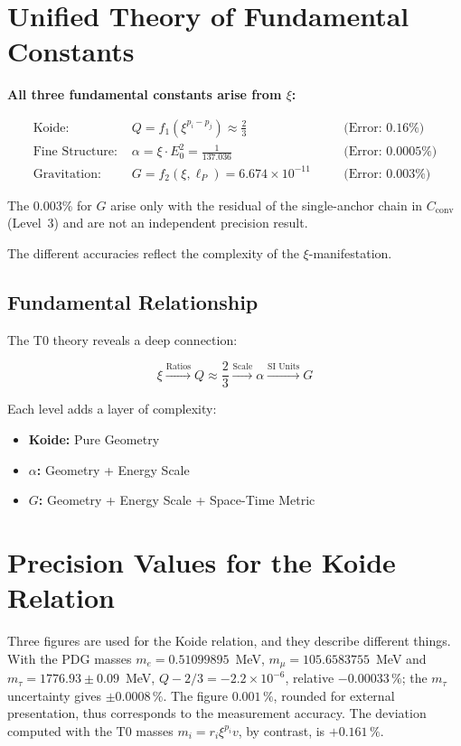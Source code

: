 
	\section{Unified Theory of Fundamental Constants}
	
	\begin{folgerung}
		\textbf{All three fundamental constants arise from $\xi$:}
		
		\begin{align}
			\text{Koide: } & Q = f_1(\xi^{p_i - p_j}) \approx \frac{2}{3} \quad &&\text{(Error: } 0.16\%) \\
			\text{Fine Structure: } & \alpha = \xi \cdot E_0^2 = \frac{1}{137.036} \quad &&\text{(Error: } 0.0005\%) \\
			\text{Gravitation: } & G = f_2(\xi, \ell_P) = 6.674 \times 10^{-11} \quad &&\text{(Error: } 0.003\%)
		\end{align}
		
		The $0.003\%$ for $G$ arise only with the residual of the single-anchor chain in $C_{\text{conv}}$ (Level~3) and are not an independent precision result.
		
		The different accuracies reflect the complexity of the $\xi$-manifestation.
	\end{folgerung}
	
	\subsection{Fundamental Relationship}
	
	The T0 theory reveals a deep connection:
	
	\begin{equation}
		\boxed{\xi \xrightarrow{\text{Ratios}} Q \approx \frac{2}{3} \xrightarrow{\text{Scale}} \alpha \xrightarrow{\text{SI Units}} G}
	\end{equation}
	
	Each level adds a layer of complexity:
	\begin{itemize}
		\item \textbf{Koide:} Pure Geometry
		\item \textbf{$\alpha$:} Geometry + Energy Scale
		\item \textbf{$G$:} Geometry + Energy Scale + Space-Time Metric
	\end{itemize}
	
\section*{Precision Values for the Koide Relation}

Three figures are used for the Koide relation, and they describe different things.
With the PDG masses $m_e = 0.51099895$~MeV, $m_\mu = 105.6583755$~MeV and
$m_\tau = 1776.93 \pm 0.09$~MeV, $Q - 2/3 = -2.2\times10^{-6}$, relative
$-0.00033\,\%$; the $m_\tau$ uncertainty gives $\pm 0.0008\,\%$. The figure $0.001\,\%$,
rounded for external presentation, thus corresponds to the measurement accuracy.
The deviation computed with the T0 masses $m_i = r_i\xi^{p_i}v$, by contrast, is $+0.161\,\%$.
